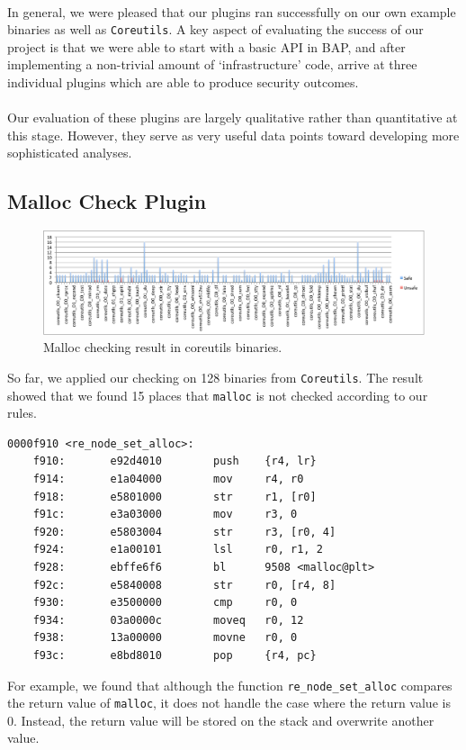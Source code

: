 \documentclass[letterpaper,11pt]{article}
\begin{document}
\paragraph{}
In general, we were pleased that our plugins ran successfully on our own
example binaries as well as \texttt{Coreutils}. A key aspect of evaluating
the success of our project is that we were able to start with a basic API in
BAP, and after implementing a non-trivial amount of `infrastructure' code,
arrive at three individual plugins which are able to produce security outcomes.

\paragraph{}
Our evaluation of these plugins are largely qualitative rather than
quantitative at this stage. However, they serve as very useful data points
toward developing more sophisticated analyses.

\subsection{Malloc Check Plugin}

\begin{figure}[h!]
      \caption{Malloc checking result in coreutils binaries.}
        \centering
    \includegraphics[width=1.0\textwidth]{malloccheckplot}
\end{figure}
So far, we applied our checking on 128 binaries from \texttt{Coreutils}. The
result showed that we found 15 places that \texttt{malloc} is not checked
according to our rules.
\begin{center}
\lstset{language=C, label=strcpy_asm,
caption=Function re\_node\_set\_alloc, breaklines=true, basicstyle=\tiny, numbers=none}
\begin{lstlisting}
0000f910 <re_node_set_alloc>:
    f910:       e92d4010        push    {r4, lr}
    f914:       e1a04000        mov     r4, r0
    f918:       e5801000        str     r1, [r0]
    f91c:       e3a03000        mov     r3, 0
    f920:       e5803004        str     r3, [r0, 4]
    f924:       e1a00101        lsl     r0, r1, 2
    f928:       ebffe6f6        bl      9508 <malloc@plt>
    f92c:       e5840008        str     r0, [r4, 8]
    f930:       e3500000        cmp     r0, 0
    f934:       03a0000c        moveq   r0, 12
    f938:       13a00000        movne   r0, 0
    f93c:       e8bd8010        pop     {r4, pc}
\end{lstlisting}
\end{center}
For example, we found that although the function \texttt{re\_node\_set\_alloc}
compares the return value of \texttt{malloc}, it does not handle the case
where the return value is 0. Instead, the return value will be stored on the
stack and overwrite another value.
\end{document}
